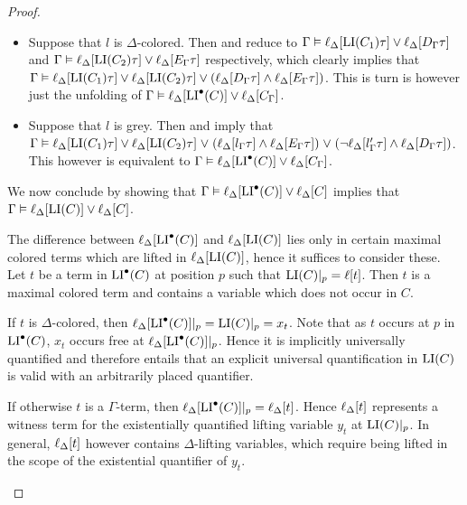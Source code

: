 \documentclass[,%
	draft=false,%
	numbers=noendperiod
	11pt,
	a4paper,
	oneside,%
	openany,
]{memoir}
\begin{document}
\begin{proof}
\begin{description}
\begin{itemize}
				\item Suppose that $l$ is $\Delta$-colored.
					Then \markA{} and \markB{} reduce to 
					$\Gamma \vDash \ell_{\Delta}[\operatorname{LI}(C_1)\tau] \lor \ell_{\Delta}[D_\Gamma\tau]$
					and
					$\Gamma \vDash \ell_{\Delta}[\operatorname{LI}(C_2)\tau] \lor \ell_{\Delta}[E_\Gamma\tau]$
					respectively,
					which clearly implies that 
					$\Gamma \vDash \ell_{\Delta}[\operatorname{LI}(C_1)\tau] \lor \ell_{\Delta}[\operatorname{LI}(C_2)\tau] \lor (\ell_{\Delta}[D_\Gamma\tau] \land \ell_{\Delta}[E_\Gamma\tau])$.
					This is turn is however just the unfolding of
					$\Gamma \vDash \ell_{\Delta}[\operatorname{LI}^\bullet(C)] \lor \ell_{\Delta}[C_\Gamma]$.

				\item Suppose that $l$ is grey.
					Then \markA{} and \markB{} imply that
					$\Gamma \vDash
					\ell_{\Delta}[\operatorname{LI}(C_1)\tau] \lor
					\ell_{\Delta}[\operatorname{LI}(C_2)\tau] \;{\lor}\;\allowbreak
					(\ell_{\Delta}[l_\Gamma\tau] \land \ell_{\Delta}[E_\Gamma\tau]) \;{\lor}\;\allowbreak
					(\lnot\ell_{\Delta}[l'_\Gamma\tau] \land \ell_{\Delta}[D_\Gamma\tau])$.
					This however is equivalent to
					$\Gamma \vDash \ell_{\Delta}[\operatorname{LI}^\bullet(C)] \lor \ell_{\Delta}[C_\Gamma]$.

			\end{itemize}


			We now conclude by showing that 
			$\Gamma \vDash \ell_{\Delta}[\operatorname{LI}^\bullet(C)] \lor \ell_{\Delta}[C]$
			implies that 
			$\Gamma \vDash \ell_{\Delta}[\operatorname{LI}(C)] \lor \ell_{\Delta}[C]$.

			The difference between $\ell_{\Delta}[\operatorname{LI}^\bullet(C)]$ and $\ell_{\Delta}[\operatorname{LI}(C)]$ lies only in certain maximal colored terms which are lifted in $\ell_{\Delta}[\operatorname{LI}(C)]$, hence it suffices to consider these.
			Let $t$ be a term in $\operatorname{LI}^\bullet(C)$ at position $p$ such that $\operatorname{LI}(C)|_{p} = \ell[t]$.
			Then $t$ is a maximal colored term and contains a variable which does not occur in\nolinebreak{} $C$.

			If $t$ is $\Delta$-colored, then $\ell_{\Delta}[\operatorname{LI}^\bullet(C)]|_{p} = \operatorname{LI}(C)|_{p} = x_t$.
			Note that as $t$ occurs at $p$ in $\operatorname{LI}^\bullet(C)$, $x_t$ occurs free at $\ell_{\Delta}[\operatorname{LI}^\bullet(C)]|_{p}$.
			Hence it is implicitly universally quantified and therefore entails that an explicit universal quantification in $\operatorname{LI}(C)$ is valid with an arbitrarily placed quantifier.  

			If otherwise $t$ is a $\Gamma$-term, then $\ell_{\Delta}[\operatorname{LI}^\bullet(C)]|_{p} = \ell_{\Delta}[t]$.
			Hence $\ell_{\Delta}[t]$ represents a witness term for the existentially quantified lifting variable $y_t$ at $\operatorname{LI}(C)|_{p}$.
			In general, $\ell_{\Delta}[t]$ however contains $\Delta$-lifting variables, which require being lifted in the scope of the existential quantifier of $y_t$. 


\end{description}
\end{proof}
\end{document}
